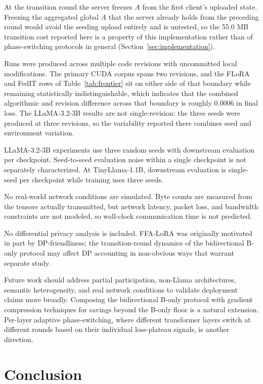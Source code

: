 At the transition round the server freezes $A$ from the first client's uploaded state. Freezing the aggregated global $A$ that the server already holds from the preceding round would avoid the seeding upload entirely and is untested, so the 55.0 MB transition cost reported here is a property of this implementation rather than of phase-switching protocols in general (Section~\ref{sec:implementation}).

Runs were produced across multiple code revisions with uncommitted local modifications. The primary CUDA corpus spans two revisions, and the FLoRA and FedIT rows of Table~\ref{tab:frontier} sit on either side of that boundary while remaining statistically indistinguishable, which indicates that the combined algorithmic and revision difference across that boundary is roughly 0.0006 in final loss. The LLaMA-3.2-3B results are not single-revision: the three seeds were produced at three revisions, so the variability reported there combines seed and environment variation.

LLaMA-3.2-3B experiments use three random seeds with downstream evaluation per checkpoint. Seed-to-seed evaluation noise within a single checkpoint is not separately characterized. At TinyLlama-1.1B, downstream evaluation is single-seed per checkpoint while training uses three seeds.

No real-world network conditions are simulated. Byte counts are measured from the tensors actually transmitted, but network latency, packet loss, and bandwidth constraints are not modeled, so wall-clock communication time is not predicted.

No differential privacy analysis is included. FFA-LoRA \citep{sun2024ffalora} was originally motivated in part by DP-friendliness; the transition-round dynamics of the bidirectional B-only protocol may affect DP accounting in non-obvious ways that warrant separate study.

Future work should address partial participation, non-Llama architectures, semantic heterogeneity, and real network conditions to validate deployment claims more broadly. Composing the bidirectional B-only protocol with gradient compression techniques \citep{alistarh2017qsgd,lin2017deep} for savings beyond the B-only floor is a natural extension. Per-layer adaptive phase-switching, where different transformer layers switch at different rounds based on their individual loss-plateau signals, is another direction.

\section{Conclusion}
\label{sec:conclusion}

